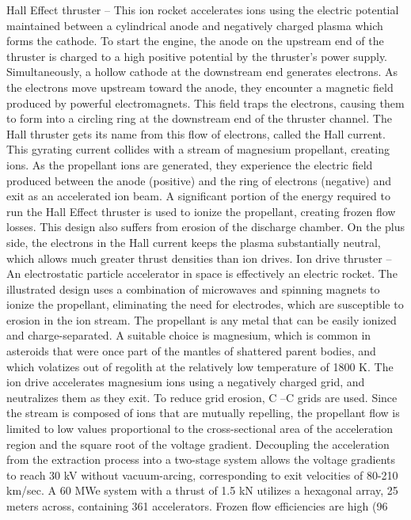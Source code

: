 \documentclass[a4paper]{book}
\begin{document}
 Hall Effect thruster – This ion rocket accelerates ions using the electric potential maintained between a cylindrical anode and negatively charged plasma which forms the cathode. To start the engine, the anode on the upstream end of the thruster is charged to a high positive potential by the thruster's power supply. Simultaneously, a hollow cathode at the downstream end generates electrons. As the electrons move upstream toward the anode, they encounter a magnetic field produced by powerful electromagnets. This field traps the electrons, causing them to form into a circling ring at the downstream end of the thruster channel. The Hall thruster gets its name from this flow of electrons, called the Hall current. This gyrating current collides with a stream of magnesium propellant, creating ions. As the propellant ions are generated, they experience the electric field produced between the anode (positive) and the ring of electrons (negative) and exit as an accelerated ion beam. A significant portion of the energy required to run the Hall Effect thruster is used to ionize the propellant, creating frozen flow losses.  This design also suffers from erosion of the discharge chamber. On the plus side, the electrons in the Hall current keeps the plasma substantially neutral, which allows much greater thrust densities than ion drives.   
Ion drive thruster –An electrostatic particle accelerator in space is effectively an electric rocket. The illustrated design uses a combination of microwaves and spinning magnets to ionize the propellant, eliminating the need for electrodes, which are susceptible to erosion in the ion stream.  The propellant is any metal that can be easily ionized and charge-separated. A suitable choice is magnesium, which is common in asteroids that were once part of the mantles of shattered parent bodies, and which volatizes out of regolith at the relatively low temperature of 1800 K.  The ion drive accelerates magnesium ions using a negatively charged grid, and neutralizes them as they exit.  To reduce grid erosion, C –C grids are used. Since the stream is composed of ions that are mutually repelling, the propellant flow is limited to low values proportional to the cross-sectional area of the acceleration region and the square root of the voltage gradient.  Decoupling the acceleration from the extraction process into a two-stage system allows the voltage gradients to reach 30 kV without vacuum-arcing, corresponding to exit velocities of 80-210 km/sec. A 60 MWe system with a thrust of 1.5 kN utilizes a hexagonal array, 25 meters across, containing 361 accelerators. Frozen flow efficiencies are high (96%
 
\end{document}
